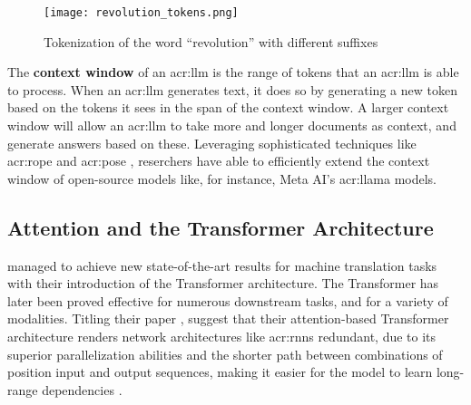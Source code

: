 \begin{figure}[htp]
    \centering
    \texttt{[image: revolution\_tokens.png]}
    \caption{Tokenization of the word \enquote{revolution} with different suffixes}
    \label{fig:tokenization-revolution}
\end{figure}

The \textbf{context window} of an \acrshort{acr:llm} is the range of tokens that an \acrshort{acr:llm} is able to process. When an \acrshort{acr:llm} generates text, it does so by generating a new token based on the tokens it sees in the span of the context window. A larger context window will allow an \acrshort{acr:llm} to take more and longer documents as context, and generate answers based on these. Leveraging sophisticated techniques like \gls{acr:rope} \citep{suRoFormerEnhancedTransformer2024} and \gls{acr:pose} \citep{zhuPoSEEfficientContext2024}, reserchers have able to efficiently extend the context window of open-source models like, for instance, Meta AI's \acrshort{acr:llama} models.


\subsection{Attention and the Transformer Architecture}
\label{subsec:attention-and-the-transformer-architecture}

\cite{vaswaniAttentionAllYou2017} managed to achieve new state-of-the-art results for machine translation tasks with their introduction of the Transformer architecture. The Transformer has later been proved effective for numerous downstream tasks, and for a variety of modalities. Titling their paper , \citeauthor{vaswaniAttentionAllYou2017} suggest that their attention-based Transformer architecture renders network architectures like \glspl{acr:rnn} redundant, due to its superior parallelization abilities and the shorter path between combinations of position input and output sequences, making it easier for the model to learn long-range dependencies \citep[6]{vaswaniAttentionAllYou2017}.

